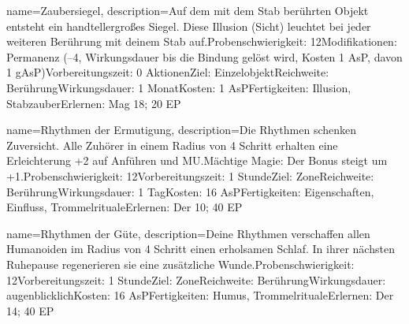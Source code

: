 {
    name={Zaubersiegel},
    description={Auf dem mit dem Stab berührten Objekt entsteht ein handtellergroßes Siegel. Diese Illusion (Sicht) leuchtet bei jeder weiteren Berührung mit deinem Stab auf.\newline Probenschwierigkeit: 12\newline Modifikationen: Permanenz (–4, Wirkungsdauer bis die Bindung gelöst wird, Kosten 1 AsP, davon 1 gAsP)\newline Vorbereitungszeit: 0 Aktionen\newline Ziel: Einzelobjekt\newline Reichweite: Berührung\newline Wirkungsdauer: 1 Monat\newline Kosten: 1 AsP\newline Fertigkeiten: Illusion, Stabzauber\newline Erlernen: Mag 18; 20 EP}
}


{
    name={Rhythmen der Ermutigung},
    description={Die Rhythmen schenken Zuversicht. Alle Zuhörer in einem Radius von 4 Schritt erhalten eine Erleichterung +2 auf Anführen und MU.\newline Mächtige Magie: Der Bonus steigt um +1.\newline Probenschwierigkeit: 12\newline Vorbereitungszeit: 1 Stunde\newline Ziel: Zone\newline Reichweite: Berührung\newline Wirkungsdauer: 1 Tag\newline Kosten: 16 AsP\newline Fertigkeiten: Eigenschaften, Einfluss, Trommelrituale\newline Erlernen: Der 10; 40 EP}
}


{
    name={Rhythmen der Güte},
    description={Deine Rhythmen verschaffen allen Humanoiden im Radius von 4 Schritt einen erholsamen Schlaf. In ihrer nächsten Ruhepause regenerieren sie eine zusätzliche Wunde.\newline Probenschwierigkeit: 12\newline Vorbereitungszeit: 1 Stunde\newline Ziel: Zone\newline Reichweite: Berührung\newline Wirkungsdauer: augenblicklich\newline Kosten: 16 AsP\newline Fertigkeiten: Humus, Trommelrituale\newline Erlernen: Der 14; 40 EP}
}


